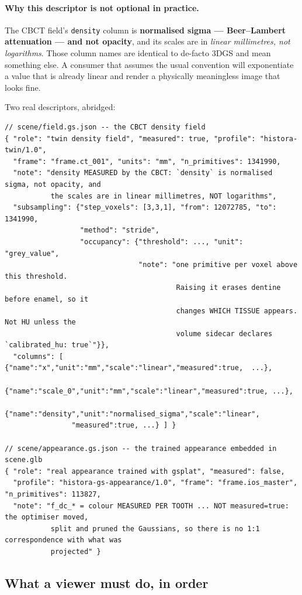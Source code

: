 \documentclass[11pt,a4paper]{article}
\newcommand{\code}[1]{\texttt{\small #1}}
\begin{document}
\paragraph{Why this descriptor is not optional in practice.}
The CBCT field's \code{density} column is \textbf{normalised sigma --- Beer--Lambert
attenuation --- and not opacity}, and its scales are in \emph{linear millimetres, not
logarithms}. Those column names are identical to de-facto 3DGS and mean something else. A
consumer that assumes the usual convention will exponentiate a value that is already
linear and render a physically meaningless image that looks fine.

\newpage
Two real descriptors, abridged:

\begin{lstlisting}[style=js]
// scene/field.gs.json -- the CBCT density field
{ "role": "twin density field", "measured": true, "profile": "histora-twin/1.0",
  "frame": "frame.ct_001", "units": "mm", "n_primitives": 1341990,
  "note": "density MEASURED by the CBCT: `density` is normalised sigma, not opacity, and
           the scales are in linear millimetres, NOT logarithms",
  "subsampling": {"step_voxels": [3,3,1], "from": 12072785, "to": 1341990,
                  "method": "stride",
                  "occupancy": {"threshold": ..., "unit": "grey_value",
                                "note": "one primitive per voxel above this threshold.
                                         Raising it erases dentine before enamel, so it
                                         changes WHICH TISSUE appears. Not HU unless the
                                         volume sidecar declares `calibrated_hu: true`"}},
  "columns": [ {"name":"x","unit":"mm","scale":"linear","measured":true,  ...},
               {"name":"scale_0","unit":"mm","scale":"linear","measured":true, ...},
               {"name":"density","unit":"normalised_sigma","scale":"linear",
                "measured":true, ...} ] }

// scene/appearance.gs.json -- the trained appearance embedded in scene.glb
{ "role": "real appearance trained with gsplat", "measured": false,
  "profile": "histora-gs-appearance/1.0", "frame": "frame.ios_master", "n_primitives": 113827,
  "note": "f_dc_* = colour MEASURED PER TOOTH ... NOT measured=true: the optimiser moved,
           split and pruned the Gaussians, so there is no 1:1 correspondence with what was
           projected" }
\end{lstlisting}

\subsection{What a viewer must do, in order}\label{sec:vieweralgo}
\end{document}
